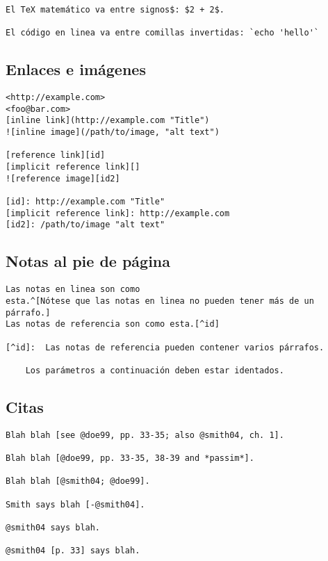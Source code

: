 \documentclass[12pt,es-ES,]{article}
\begin{document}
\begin{verbatim}
El TeX matemático va entre signos$: $2 + 2$.

El código en linea va entre comillas invertidas: `echo 'hello'`
\end{verbatim}

\subsection{Enlaces e imágenes}\label{enlaces-e-imuxe1genes}

\begin{verbatim}
<http://example.com>
<foo@bar.com>
[inline link](http://example.com "Title")
![inline image](/path/to/image, "alt text")

[reference link][id]
[implicit reference link][]
![reference image][id2]

[id]: http://example.com "Title"
[implicit reference link]: http://example.com
[id2]: /path/to/image "alt text"
\end{verbatim}

\subsection{Notas al pie de página}\label{notas-al-pie-de-puxe1gina}

\begin{verbatim}
Las notas en linea son como
esta.^[Nótese que las notas en linea no pueden tener más de un párrafo.]
Las notas de referencia son como esta.[^id]

[^id]:  Las notas de referencia pueden contener varios párrafos.

    Los parámetros a continuación deben estar identados.
\end{verbatim}

\subsection{Citas}\label{citas}

\begin{verbatim}
Blah blah [see @doe99, pp. 33-35; also @smith04, ch. 1].

Blah blah [@doe99, pp. 33-35, 38-39 and *passim*].

Blah blah [@smith04; @doe99].

Smith says blah [-@smith04].

@smith04 says blah.

@smith04 [p. 33] says blah.
\end{verbatim}
\end{document}
